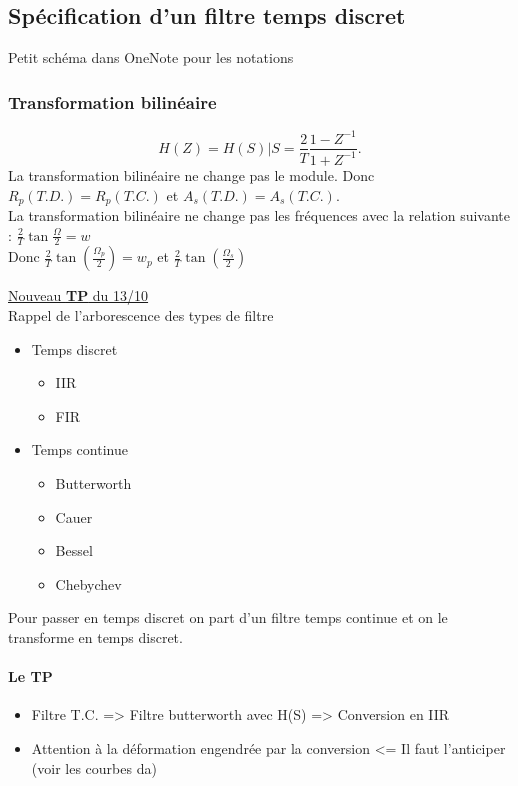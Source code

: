 \documentclass{article}
\theoremstyle{plain}%
\theoremstyle{definition}
\theoremstyle{remark}
\begin{document}
\subsection{Spécification d'un filtre temps discret}
Petit schéma dans OneNote pour les notations

\subsubsection{Transformation bilinéaire}
\[
    H(Z) = H(S) | S = \frac{2}{T} \frac{1 - Z^{-1}}{1 + Z^{-1}}
.\]
La transformation bilinéaire ne change pas le module. Donc $ R_p (T.D.) = R_p(T.C.) $ et $ A_s(T.D.) = A_s(T.C.) $. \\
La transformation bilinéaire ne change pas les fréquences avec la relation suivante : $ \frac{2}{T} \tan \frac{\Omega }{2} = w $ \\
Donc $ \frac{2}{T}\tan (\frac{\Omega_p}{2}) = w_p $ et $ \frac{2}{T} \tan (\frac{\Omega _s}{2}) $ 

\underline{Nouveau \textbf{TP} du 13/10} \\
Rappel de l'arborescence des types de filtre
\begin{itemize}
    \item Temps discret \begin{itemize}
        \item IIR
        \item FIR
    \end{itemize}
    \item Temps continue\begin{itemize}
        \item Butterworth
        \item Cauer
        \item Bessel
        \item Chebychev
    \end{itemize}
\end{itemize}
Pour passer en temps discret on part d'un filtre temps continue et on le transforme en temps discret.

\paragraph*{Le TP}
\begin{itemize}
    \item Filtre T.C. => Filtre butterworth avec H(S) => Conversion en IIR
    \item Attention à la déformation engendrée par la conversion <= Il faut l'anticiper (voir les courbes da)
\end{itemize}
\end{document}
